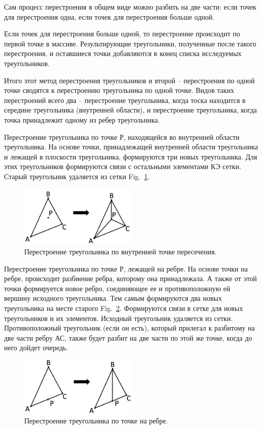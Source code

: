 \documentclass[
11pt,%
tightenlines,%
twoside,%
onecolumn,%
nofloats,%
nobibnotes,%
nofootinbib,%
superscriptaddress,%
noshowpacs,%
centertags]%
{revtex4}
\begin{document}
Сам процесс перестроения в общем виде можно разбить на две части: если точек для перестроения одна, если точек для перестроения больше одной.

Если точек для перестроения больше одной, то перестроение происходит по первой точке в массиве. Результирующие треугольники, полученные после такого перестроения, и оставшиеся точки добавляются в конец списка исследуемых треугольников.

Итого этот метод перестроения треугольников и второй – перестроения по одной точке сводятся к перестроению треугольника по одной точке. Видов таких перестроений всего два – перестроение треугольника, когда тоска находится в середине треугольника (внутренней области), и перестроение треугольника, когда точка принадлежит одному из ребер треугольника.

Перестроение треугольника по точке Р, находящейся во внутренней области треугольника. На основе точки, принадлежащей внутренней области треугольника и лежащей в плоскости треугольника, формируются три новых треугольника. Для этих треугольников формируются связи с остальными элементами КЭ сетки. Старый треугольник удаляется из сетки Fig.~\ref{fig:7}.

\begin{figure}[h]
\includegraphics[width=0.5\textwidth]{pics/pic_7.png}
\caption{Перестроение треугольника по внутренней точке пересечения.}\label{fig:7}
\end{figure}

Перестроение треугольника по точке Р, лежащей на ребре. На основе точки на ребре, происходит разбиение ребра, которому она принадлежала. А также от этой точки формируется новое ребро, соединяющее ее и противоположную ей вершину исходного треугольника. Тем самым формируются два новых треугольника на месте старого Fig.~\ref{fig:8}. Формируются связи в сетке для новых треугольников и их элементов. Исходный треугольник удаляется из сетки. Противоположный треугольник (если он есть), который прилегал к разбитому на две части ребру АС, также будет разбит на две части по этой же точке, когда до него дойдет очередь.

\begin{figure}[h]
\includegraphics[width=0.5\textwidth]{pics/pic_8.png}
\caption{Перестроение треугольника по точке на ребре.}\label{fig:8}
\end{figure}
\end{document}
